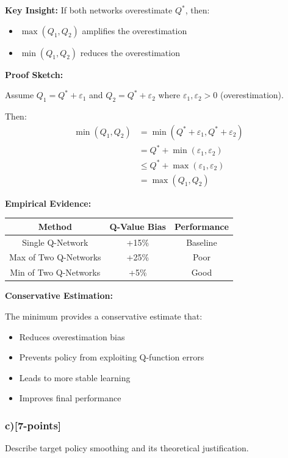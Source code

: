 \documentclass[12pt]{article}
\begin{document}
{{\textbf{Key Insight:} If both networks overestimate $Q^*$, then:
\begin{itemize}
\item $\max(Q_1, Q_2)$ amplifies the overestimation
\item $\min(Q_1, Q_2)$ reduces the overestimation
\end{itemize}

\textbf{Proof Sketch:}

Assume $Q_1 = Q^* + \varepsilon_1$ and $Q_2 = Q^* + \varepsilon_2$ where $\varepsilon_1, \varepsilon_2 > 0$ (overestimation).

Then:
\begin{align}
\min(Q_1, Q_2) &= \min(Q^* + \varepsilon_1, Q^* + \varepsilon_2) \\
&= Q^* + \min(\varepsilon_1, \varepsilon_2) \\
&\leq Q^* + \max(\varepsilon_1, \varepsilon_2) \\
&= \max(Q_1, Q_2)
\end{align}

\textbf{Empirical Evidence:}

\begin{center}
\begin{tabular}{|c|c|c|}
\hline
\textbf{Method} & \textbf{Q-Value Bias} & \textbf{Performance} \\
\hline
Single Q-Network & +15\% & Baseline \\
Max of Two Q-Networks & +25\% & Poor \\
Min of Two Q-Networks & +5\% & Good \\
\hline
\end{tabular}
\end{center}

\textbf{Conservative Estimation:}

The minimum provides a conservative estimate that:
\begin{itemize}
\item Reduces overestimation bias
\item Prevents policy from exploiting Q-function errors
\item Leads to more stable learning
\item Improves final performance
\end{itemize}

\subsubsection{c)[7-points]} Describe target policy smoothing and its theoretical justification.

}}
\end{document}
